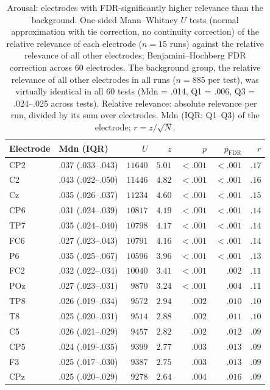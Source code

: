 \begin{table}[ht]
\centering
\small
\setlength{\tabcolsep}{4pt}
\caption{Arousal: electrodes with FDR-significantly higher relevance than the background. One-sided Mann--Whitney $U$ tests (normal approximation with tie correction, no continuity correction) of the relative relevance of each electrode ($n = 15$ runs) against the relative relevance of all other electrodes; Benjamini--Hochberg FDR correction across 60 electrodes. The background group, the relative relevance of all other electrodes in all runs ($n = 885$ per test), was virtually identical in all 60 tests (Mdn = .014, Q1 = .006, Q3 = .024--.025 across tests). Relative relevance: absolute relevance per run, divided by its sum over electrodes. Mdn (IQR: Q1--Q3) of the electrode; $r = z / \sqrt{N}$.}
\label{tab:arousal_electrode_mwu}
\begin{tabular}{llrrrrr}
\toprule
Electrode & Mdn (IQR) & $U$ & $z$ & $p$ & $p_{\mathrm{FDR}}$ & $r$ \\
\midrule
CP2 & .037 (.033--.043) & $11640$ & $5.01$ & $< .001$ & $< .001$ & $.17$ \\
C2 & .043 (.022--.050) & $11446$ & $4.82$ & $< .001$ & $< .001$ & $.16$ \\
Cz & .035 (.026--.037) & $11234$ & $4.60$ & $< .001$ & $< .001$ & $.15$ \\
CP6 & .031 (.024--.039) & $10817$ & $4.19$ & $< .001$ & $< .001$ & $.14$ \\
TP7 & .035 (.024--.040) & $10798$ & $4.17$ & $< .001$ & $< .001$ & $.14$ \\
FC6 & .027 (.023--.043) & $10791$ & $4.16$ & $< .001$ & $< .001$ & $.14$ \\
P6 & .035 (.025--.067) & $10596$ & $3.96$ & $< .001$ & $< .001$ & $.13$ \\
FC2 & .032 (.022--.034) & $10040$ & $3.41$ & $< .001$ & $.002$ & $.11$ \\
POz & .027 (.023--.031) & $9870$ & $3.24$ & $< .001$ & $.004$ & $.11$ \\
TP8 & .026 (.019--.034) & $9572$ & $2.94$ & $.002$ & $.010$ & $.10$ \\
T8 & .025 (.020--.031) & $9514$ & $2.88$ & $.002$ & $.011$ & $.10$ \\
C5 & .026 (.021--.029) & $9457$ & $2.82$ & $.002$ & $.012$ & $.09$ \\
CP5 & .024 (.019--.035) & $9399$ & $2.77$ & $.003$ & $.013$ & $.09$ \\
F3 & .025 (.017--.030) & $9387$ & $2.75$ & $.003$ & $.013$ & $.09$ \\
CPz & .025 (.020--.029) & $9278$ & $2.64$ & $.004$ & $.016$ & $.09$ \\
\bottomrule
\end{tabular}
\end{table}
